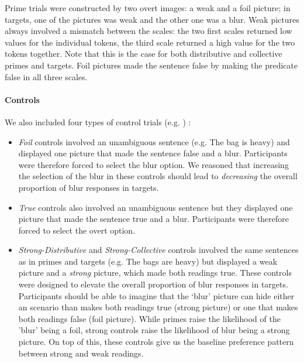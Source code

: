 \documentclass[a4paper]{article}
\begin{document}
Prime trials were constructed by two overt images: a weak and a foil picture; in targets, one of the pictures was weak and the other one was a blur.  Weak pictures always involved a mismatch between the scales: the two first scales returned low values for the individual tokens, the third scale returned a high value for the two tokens together.  Note that this is the case for both distributive and collective primes and targets. Foil pictures made the sentence false by making the predicate false in all three scales. 


\paragraph{Controls} We also included four types of control trials (e.g. ) : 

\begin{itemize}

\item \emph{Foil} controls involved an unambiguous sentence (e.g. The bag is heavy) and displayed one picture that made the sentence false and a blur. 
Participants were therefore forced to select the blur option. We reasoned that increasing the selection of the blur in these controls should lead to \emph{decreasing} the overall proportion of blur responses in targets. 

\item \emph{True} controls also involved an unambiguous sentence but they displayed one picture that made the sentence true and a blur. 
Participants were therefore forced to select the overt option.

\item \emph{Strong-Distributive} and \emph{Strong-Collective} controls involved the same sentences as in primes and targets (e.g. The bags are heavy) but displayed a weak picture and a \emph{strong} picture, which made both readings true. These controls were designed to elevate the overall proportion of blur responses in targets. 
Participants should be able to imagine that the `blur' picture can hide either an scenario than makes both readings true (strong picture) or one that makes both readings false (foil picture). While primes raise the likelihood of the 'blur' being a foil, strong controls raise the likelihood of blur being a strong picture. 
On top of this, these controls give us the baseline preference pattern between strong and weak readings. 


\end{itemize}
\end{document}
